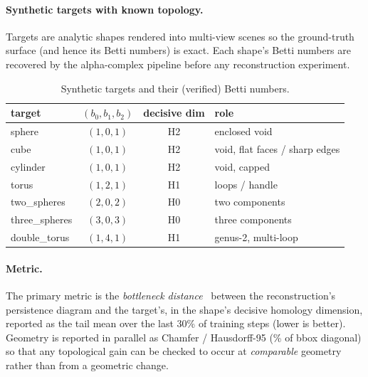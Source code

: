 \paragraph{Synthetic targets with known topology.}
Targets are analytic shapes rendered into multi-view scenes so the ground-truth
surface (and hence its Betti numbers) is exact. Each shape's Betti numbers are
recovered by the alpha-complex pipeline before any reconstruction experiment.
\begin{table}[h]
\centering
\begin{tabular}{lccl}
\toprule
target & $(b_0,b_1,b_2)$ & decisive dim & role \\
\midrule
sphere        & $(1,0,1)$ & H2 & enclosed void \\
cube          & $(1,0,1)$ & H2 & void, flat faces / sharp edges \\
cylinder      & $(1,0,1)$ & H2 & void, capped \\
torus         & $(1,2,1)$ & H1 & loops / handle \\
two\_spheres  & $(2,0,2)$ & H0 & two components \\
three\_spheres& $(3,0,3)$ & H0 & three components \\
double\_torus & $(1,4,1)$ & H1 & genus-2, multi-loop \\
\bottomrule
\end{tabular}
\caption{Synthetic targets and their (verified) Betti numbers.}
\label{tab:targets}
\end{table}

\paragraph{Metric.}
The primary metric is the \emph{bottleneck
distance}~\cite{cohensteiner2007stability,edelsbrunner2010book} between the reconstruction's
persistence diagram and the target's, in the shape's decisive homology dimension,
reported as the tail mean over the last 30\% of training steps (lower is better).
Geometry is reported in parallel as Chamfer / Hausdorff-95 (\% of bbox diagonal)
so that any topological gain can be checked to occur at \emph{comparable}
geometry rather than from a geometric change.


